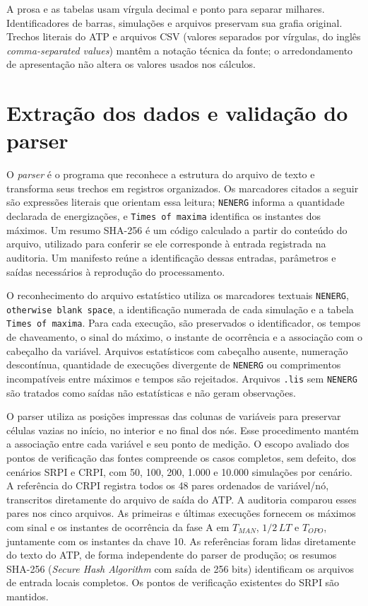 \documentclass[
	12pt,				%
	openright,			%
	oneside,			%
	a4paper,			%
	chapter=TITLE,		%
	section=TITLE,		%
	subsection=TITLE,	%
	subsubsection=TITLE,%
	english,			%
	brazilian			%
	]{abntex2}
\theoremstyle{definition}
\begin{document}
A prosa e as tabelas usam vírgula decimal e ponto para separar milhares.
Identificadores de barras, simulações e arquivos preservam sua grafia
original. Trechos literais do ATP e arquivos CSV (valores separados por vírgulas,
do inglês \textit{comma-separated values}) mantêm a notação técnica
da fonte; o arredondamento de apresentação não altera os valores usados
nos cálculos.

\section{Extração dos dados e validação do parser}

O \textit{parser} é o programa que reconhece a estrutura do arquivo de texto
e transforma seus trechos em registros organizados. Os marcadores citados
a seguir são expressões literais que orientam essa leitura;
\texttt{NENERG} informa a quantidade declarada de energizações, e
\texttt{Times of maxima} identifica os instantes dos máximos.
Um resumo SHA-256 é um código calculado a partir do conteúdo do arquivo,
utilizado para conferir se ele corresponde à entrada registrada na auditoria.
Um manifesto reúne a identificação dessas entradas, parâmetros e saídas
necessários à reprodução do processamento.

O reconhecimento do arquivo estatístico utiliza os marcadores textuais
\texttt{NENERG}, \texttt{otherwise blank space}, a identificação numerada de
cada simulação e a tabela \texttt{Times of maxima}. Para cada execução, são
preservados o identificador, os tempos de chaveamento, o sinal do máximo, o
instante de ocorrência e a associação com o cabeçalho da variável. Arquivos
estatísticos com cabeçalho ausente, numeração descontínua, quantidade de
execuções divergente de \texttt{NENERG} ou comprimentos incompatíveis entre
máximos e tempos são rejeitados. Arquivos \texttt{.lis} sem \texttt{NENERG}
são tratados como saídas não estatísticas e não geram observações.

O parser utiliza as posições impressas das colunas de variáveis para
preservar células vazias no início, no interior e no final dos nós. Esse
procedimento mantém a associação entre cada variável e seu ponto de medição.
O escopo avaliado dos pontos de verificação das fontes compreende os casos
completos, sem defeito, dos cenários SRPI e CRPI, com 50, 100, 200,
1.000 e 10.000 simulações por cenário. A referência do CRPI registra todos os
48 pares ordenados de variável/nó, transcritos diretamente do arquivo de saída do ATP. A auditoria
comparou esses pares nos cinco arquivos. As primeiras e últimas execuções
fornecem os máximos com sinal e os instantes de ocorrência da fase A em
$T_{MAN}$, $1/2\,LT$ e $T_{OPO}$, juntamente com os instantes da chave 10. As
referências foram lidas diretamente do texto do ATP, de forma independente do
parser de produção; os resumos SHA-256 (\textit{Secure Hash Algorithm}
com saída de 256 bits) identificam os arquivos de entrada locais completos. Os pontos de verificação existentes do SRPI são mantidos.
\end{document}
